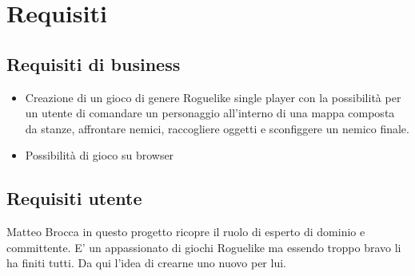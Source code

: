 \section{Requisiti}

\subsection{Requisiti di business}
\begin{itemize}
    \item Creazione di un gioco di genere Roguelike single player con la possibilità per un utente di comandare un personaggio all'interno di una mappa composta da stanze, affrontare nemici, raccogliere oggetti e sconfiggere un nemico finale.
    \item Possibilità di gioco su browser
\end{itemize}

\subsection{Requisiti utente}

Matteo Brocca in questo progetto ricopre il ruolo di esperto di dominio e committente. 
E' un appassionato di giochi Roguelike ma essendo troppo bravo li ha finiti tutti. 
Da qui l'idea di crearne uno nuovo per lui. 

